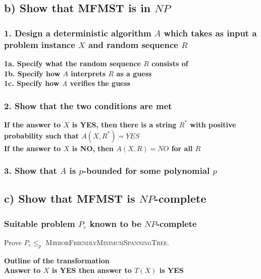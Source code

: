 \documentclass[12pt]{article}
\begin{document}
\subsection*{b) Show that MFMST is in $NP$}
\subsubsection*{1. Design a deterministic algorithm $A$ which takes as input a problem instance $X$ and random sequence $R$}

\textbf{1a. Specify what the random sequence $R$ consists of}\\

\textbf{1b. Specify how $A$ interprets $R$ as a guess}\\

\textbf{1c. Specify how $A$ verifies the guess}\\

\subsubsection*{2. Show that the two conditions are met}

\textbf{If the answer to $X$ is YES, then there is a string $R^*$ with positive probability such that $A(X, R^*) = YES$}\\

\textbf{If the answer to $X$ is NO, then $A(X, R) = NO$ for all $R$}\\

\subsubsection*{3. Show that $A$ is $p$-bounded for some polynomial $p$}

\subsection*{c) Show that MFMST is $NP$-complete}
\subsubsection*{Suitable problem $P_c$ known to be $NP$-complete}

Prove $P_c \leq_p$ \textsc{MirrorFriendlyMinimumSpanningTree}.

\textbf{Outline of the transformation}\\

\textbf{Answer to $X$ is YES then answer to $T(X)$ is YES}\\
\end{document}

